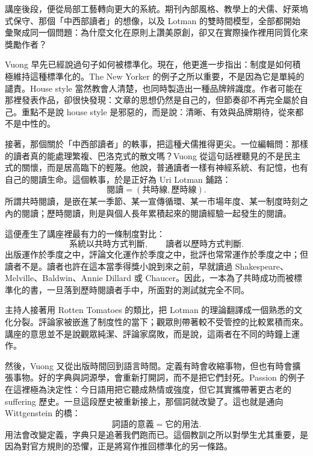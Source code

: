 講座後段，便從局部工藝轉向更大的系統。期刊內部風格、教學上的犬儒、好萊塢式保守、那個「中西部讀者」的想像，以及 Lotman 的雙時間模型，全部都開始彙聚成同一個問題：為什麼文化在原則上讚美原創，卻又在實際操作裡用同質化來獎勵作者？

Vuong 早先已經說過句子如何被標準化。現在，他更進一步指出：制度是如何積極維持這種標準化的。The New Yorker 的例子之所以重要，不是因為它是單純的譴責。House style 當然教會人清楚，也同時製造出一種品牌辨識度。作者可能在那裡發表作品，卻很快發現：文章的思想仍然是自己的，但節奏卻不再完全屬於自己。重點不是說 house style 是邪惡的，而是說：清晰、有效與品牌期待，從來都不是中性的。

接著，那個關於「中西部讀者」的軼事，把這種犬儒推得更尖。一位編輯問：那樣的讀者真的能處理繁複、巴洛克式的散文嗎？Vuong 從這句話裡聽見的不是民主式的關懷，而是居高臨下的輕蔑。他說，普通讀者一樣有神經系統、有記憶，也有自己的閱讀生命。這個軼事，於是正好為 Uri Lotman 鋪路：
\begin{equation}
\text{閱讀} = (\text{共時線},\text{歷時線}).
\end{equation}
所謂共時閱讀，是嵌在某一季節、某一宣傳循環、某一市場年度、某一制度時刻之內的閱讀；歷時閱讀，則是與個人長年累積起來的閱讀經驗一起發生的閱讀。

這便產生了講座裡最有力的一條制度對比：
\begin{equation}
\text{系統以共時方式判斷}, \qquad \text{讀者以歷時方式判斷}.
\end{equation}
出版運作於季度之中，評論文化運作於季度之中，批評也常常運作於季度之中；但讀者不是。讀者也許在這本當季得獎小說到來之前，早就讀過 Shakespeare、Melville、Baldwin、Annie Dillard 或 Chaucer。因此，一本為了共時成功而被標準化的書，一旦落到歷時閱讀者手中，所面對的測試就完全不同。

主持人接著用 Rotten Tomatoes 的類比，把 Lotman 的理論翻譯成一個熟悉的文化分裂。評論家被嵌進了制度性的當下；觀眾則帶著較不受管控的比較累積而來。講座的意思並不是說觀眾純潔、評論家腐敗，而是說，這兩者在不同的時鐘上運作。

然後，Vuong 又從出版時間回到語言時間。定義有時會收縮事物，但也有時會擴張事物。好的字典與詞源學，會重新打開詞，而不是把它們封死。Passion 的例子在這裡極為決定性：今日語用把它聽成熱情或強度，但它其實攜帶著更古老的 suffering 歷史。一旦這段歷史被重新接上，那個詞就改變了。這也就是通向 Wittgenstein 的橋：
\begin{equation}
\text{詞語的意義} = \text{它的用法}.
\end{equation}
用法會改變定義，字典只是追著我們跑而已。這個教訓之所以對學生尤其重要，是因為對官方規則的恐懼，正是將寫作推回標準化的另一條路。

